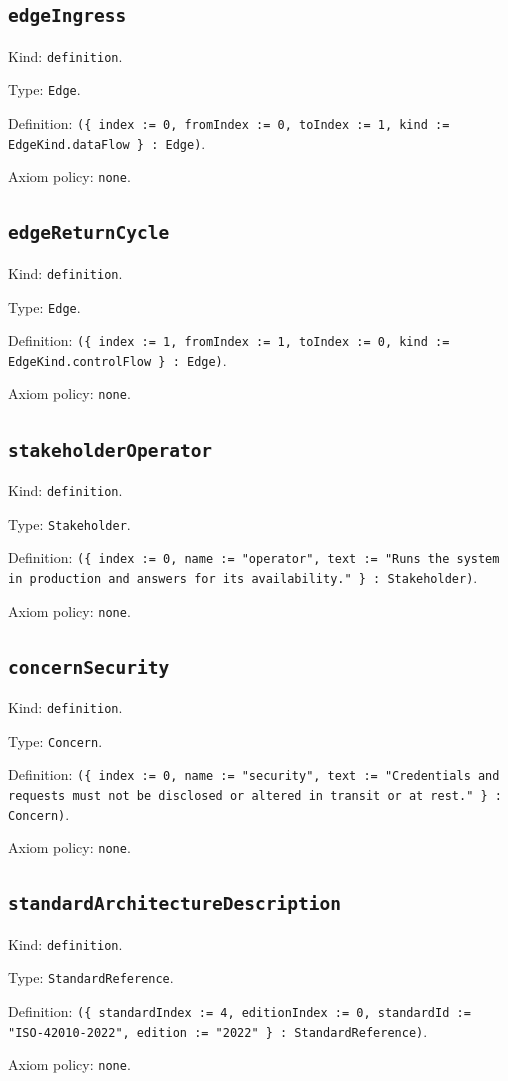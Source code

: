 \documentclass[11pt]{article}
\begin{document}
\subsection*{\texttt{edgeIngress}}
\noindent Kind: \texttt{definition}.\par
\noindent Type: \texttt{Edge}.\par
\noindent Definition: \texttt{(\{ index := 0, fromIndex := 0, toIndex := 1, kind := EdgeKind.dataFlow \} : Edge)}.\par
\noindent Axiom policy: \texttt{none}.\par
\subsection*{\texttt{edgeReturnCycle}}
\noindent Kind: \texttt{definition}.\par
\noindent Type: \texttt{Edge}.\par
\noindent Definition: \texttt{(\{ index := 1, fromIndex := 1, toIndex := 0, kind := EdgeKind.controlFlow \} : Edge)}.\par
\noindent Axiom policy: \texttt{none}.\par
\subsection*{\texttt{stakeholderOperator}}
\noindent Kind: \texttt{definition}.\par
\noindent Type: \texttt{Stakeholder}.\par
\noindent Definition: \texttt{(\{ index := 0, name := "operator", text := "Runs the system in production and answers for its availability." \} : Stakeholder)}.\par
\noindent Axiom policy: \texttt{none}.\par
\subsection*{\texttt{concernSecurity}}
\noindent Kind: \texttt{definition}.\par
\noindent Type: \texttt{Concern}.\par
\noindent Definition: \texttt{(\{ index := 0, name := "security", text := "Credentials and requests must not be disclosed or altered in transit or at rest." \} : Concern)}.\par
\noindent Axiom policy: \texttt{none}.\par
\subsection*{\texttt{standardArchitectureDescription}}
\noindent Kind: \texttt{definition}.\par
\noindent Type: \texttt{StandardReference}.\par
\noindent Definition: \texttt{(\{ standardIndex := 4, editionIndex := 0, standardId := "ISO-42010-2022", edition := "2022" \} : StandardReference)}.\par
\noindent Axiom policy: \texttt{none}.\par
\end{document}
